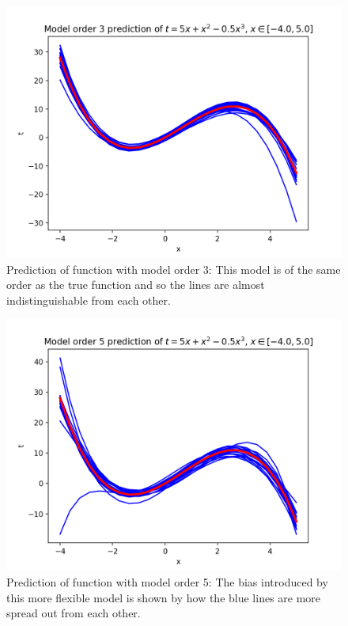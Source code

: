 \documentclass[10pt]{article}
\begin{document}
\begin{itemize}
\begin{figure}[H]
\centering
  \includegraphics[width=\linewidth]{model_bias-3.png}
 \caption{Prediction of function with model order 3: This model is of the same order as the true function and so the lines are almost indistinguishable from each other.}
\label{label}
\end{figure}

\begin{figure}[H]
\centering
  \includegraphics[width=\linewidth]{model_bias-5.png}
 \caption{Prediction of function with model order 5: The bias introduced by this more flexible model is shown by how the blue lines are more spread out from each other.}
\label{label}
\end{figure}


\end{itemize}
\end{document}
